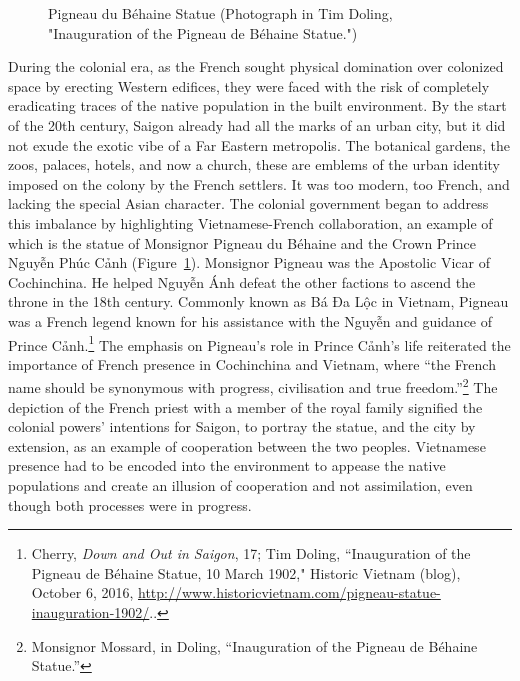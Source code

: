 \en
\begin{figure}[!ht]
\begin{center}
\vspace{-.2 in}
\caption[Pigneau du \vi Béhaine Statue \en]{Pigneau du \vi Béhaine Statue (Photograph in Tim Doling, "Inauguration of the Pigneau de Béhaine Statue."\footnotemark) \en}\label{statue_pigneau}
\end{center}
\vspace{-.35 in}
\end{figure}

\vi During the colonial era, as the French sought physical domination over colonized space by erecting Western edifices, they were faced with the risk of completely eradicating traces of the native population in the built environment. By the start of the 20th century, Saigon already had all the marks of an urban city, but it did not exude the exotic vibe of a Far Eastern metropolis. The botanical gardens, the zoos, palaces, hotels, and now a church, these are emblems of the urban identity imposed on the colony by the French settlers. It was too modern, too French, and lacking the special Asian character. The colonial government began to address this imbalance by highlighting Vietnamese-French collaboration, an example of which is the statue of Monsignor Pigneau du Béhaine and the Crown Prince Nguyễn Phúc Cảnh (Figure~\ref{statue_pigneau}). Monsignor Pigneau was the Apostolic Vicar of Cochinchina. He helped Nguyễn Ánh defeat the other factions to ascend the throne in the 18th century. Commonly known as Bá Đa Lộc in Vietnam, Pigneau was a French legend known for his assistance with the Nguyễn and guidance of Prince Cảnh.\footnote{Cherry, \textit{Down and Out in Saigon}, 17; Tim Doling, “Inauguration of the Pigneau de Béhaine Statue, 10 March 1902," Historic Vietnam (blog), October 6, 2016, \url{http://www.historicvietnam.com/pigneau-statue-inauguration-1902/}..} The emphasis on Pigneau's role in Prince Cảnh's life reiterated the importance of French presence in Cochinchina and Vietnam, where “the French name should be synonymous with progress, civilisation and true freedom.”\footnote{Monsignor Mossard, in Doling, “Inauguration of the Pigneau de Béhaine Statue.”} The depiction of the French priest with a member of the royal family signified the colonial powers' intentions for Saigon, to portray the statue, and the city by extension, as an example of cooperation between the two peoples. Vietnamese presence had to be encoded into the environment to appease the native populations and create an illusion of cooperation and not assimilation, even though both processes were in progress.

